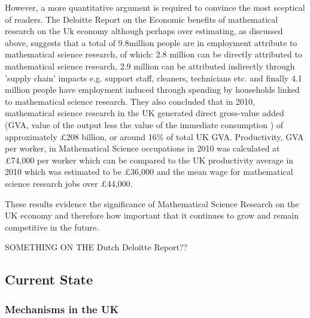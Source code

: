 \documentclass[11pt]{article} %
\begin{document}
However, a more quantitative argument is required to convince the most sceptical of readers. The Deloitte Report on the Economic benefits of mathematical research on the Uk economy \cite{deloitteuk} although perhaps over estimating, as discussed above, suggests that a total of 9.8million people are in employment attribute to mathematical science research, of which: 2.8 million can be directly attributed to mathematical science research, 2.9 million can be attributed indirectly through 'supply chain' impacts e.g. support staff, cleaners, technicians etc. and finally 4.1 million people have employment induced  through spending by households linked to mathematical science research. They also concluded that in 2010, mathematical science research in the UK generated direct gross-value added (GVA, value of the output less the value of the immediate consumption ) of approximately £208 billion, or around 16\% of total UK GVA.  Productivity, GVA per worker, in Mathematical Science occupations in 2010 was calculated at £74,000 per worker which can be compared to the UK productivity average in 2010 which was estimated to be £36,000 and the mean wage for mathematical science research jobs over £44,000. 
 
 These results evidence the significance of Mathematical Science Research on the UK economy and therefore how important that it continues to grow and remain competitive in the future. 
 
 
	
	SOMETHING ON THE Dutch Deloitte Report??
	
	 
	\subsection{Current State }
	
	\subsubsection{ Mechanisms in the UK  }
	
\end{document}
